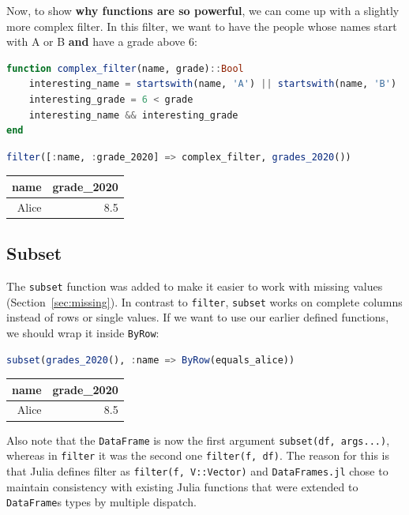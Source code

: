 \documentclass[
  notoc %
]{tufte-book}
\newcommand{\passthrough}[1]{#1}
\begin{document}
Now, to show \textbf{why functions are so powerful}, we can come up with
a slightly more complex filter. In this filter, we want to have the
people whose names start with A or B \textbf{and} have a grade above 6:

\begin{lstlisting}[language=Julia]
function complex_filter(name, grade)::Bool
    interesting_name = startswith(name, 'A') || startswith(name, 'B')
    interesting_grade = 6 < grade
    interesting_name && interesting_grade
end
\end{lstlisting}

\begin{lstlisting}[language=Julia]
filter([:name, :grade_2020] => complex_filter, grades_2020())
\end{lstlisting}

\begin{longtable}[]{@{}rr@{}}
\toprule()
name & grade\_2020 \\
\midrule()
\endhead
Alice & 8.5 \\
\bottomrule()
\end{longtable}

\hypertarget{sec:subset}{%
\subsection{Subset}\label{sec:subset}}

The \passthrough{\lstinline!subset!} function was added to make it
easier to work with missing values (Section~\ref{sec:missing}). In
contrast to \passthrough{\lstinline!filter!},
\passthrough{\lstinline!subset!} works on complete columns instead of
rows or single values. If we want to use our earlier defined functions,
we should wrap it inside \passthrough{\lstinline!ByRow!}:

\begin{lstlisting}[language=Julia]
subset(grades_2020(), :name => ByRow(equals_alice))
\end{lstlisting}

\begin{longtable}[]{@{}rr@{}}
\toprule()
name & grade\_2020 \\
\midrule()
\endhead
Alice & 8.5 \\
\bottomrule()
\end{longtable}

Also note that the \passthrough{\lstinline!DataFrame!} is now the first
argument \passthrough{\lstinline!subset(df, args...)!}, whereas in
\passthrough{\lstinline!filter!} it was the second one
\passthrough{\lstinline!filter(f, df)!}. The reason for this is that
Julia defines filter as \passthrough{\lstinline!filter(f, V::Vector)!}
and \passthrough{\lstinline!DataFrames.jl!} chose to maintain
consistency with existing Julia functions that were extended to
\passthrough{\lstinline!DataFrame!}s types by multiple dispatch.
\end{document}
